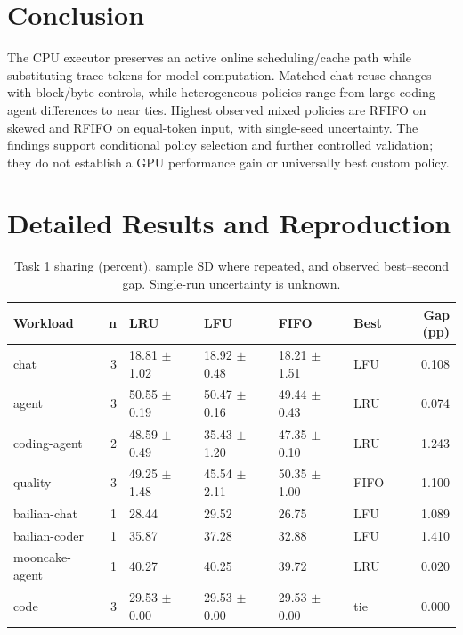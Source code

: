 \documentclass{article}
\begin{document}
\section{Conclusion}
The CPU executor preserves an active online scheduling/cache path while substituting trace tokens for model computation. Matched chat reuse changes with block/byte controls, while heterogeneous policies range from large coding-agent differences to near ties. Highest observed mixed policies are RFIFO on skewed and RFIFO on equal-token input, with single-seed uncertainty. The findings support conditional policy selection and further controlled validation; they do not establish a GPU performance gain or universally best custom policy.

\clearpage


\clearpage
\appendix
\section{Detailed Results and Reproduction}
\begin{table}[t]\centering\small
\caption{Task 1 sharing (percent), sample SD where repeated, and observed best--second gap. Single-run uncertainty is unknown.}
\begin{tabular}{lrllllr}\toprule Workload & n & LRU & LFU & FIFO & Best & Gap (pp)\\\midrule
chat & 3 & 18.81 $\pm$ 1.02 & 18.92 $\pm$ 0.48 & 18.21 $\pm$ 1.51 & LFU & 0.108\\
agent & 3 & 50.55 $\pm$ 0.19 & 50.47 $\pm$ 0.16 & 49.44 $\pm$ 0.43 & LRU & 0.074\\
coding-agent & 2 & 48.59 $\pm$ 0.49 & 35.43 $\pm$ 1.20 & 47.35 $\pm$ 0.10 & LRU & 1.243\\
quality & 3 & 49.25 $\pm$ 1.48 & 45.54 $\pm$ 2.11 & 50.35 $\pm$ 1.00 & FIFO & 1.100\\
bailian-chat & 1 & 28.44 & 29.52 & 26.75 & LFU & 1.089\\
bailian-coder & 1 & 35.87 & 37.28 & 32.88 & LFU & 1.410\\
mooncake-agent & 1 & 40.27 & 40.25 & 39.72 & LRU & 0.020\\
code & 3 & 29.53 $\pm$ 0.00 & 29.53 $\pm$ 0.00 & 29.53 $\pm$ 0.00 & tie & 0.000\\
\bottomrule\end{tabular}\end{table}
\end{document}
